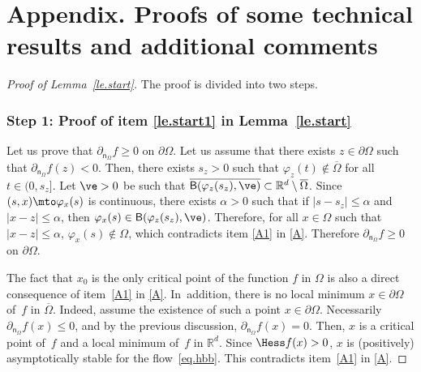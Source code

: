 \appendix
{}
\section*{Appendix. Proofs of some technical results and additional comments}

\label{sec:le.start}

\begin{proof}[Proof of Lemma~\ref{le.start}] The proof is divided into two steps.

\subsubsection*{Step 1: Proof of item \eqref{le.start1} in Lemma~\ref{le.start}}
Let us prove that $\partial_{\mathsf n_\Omega}f\ge 0$ on $\partial \Omega$. Let us assume that there exists $z\in \partial \Omega$ such that $\partial_{\mathsf n_\Omega}f(z)<0$. Then, there exists $s_z>0$ such that $\varphi_z(t) \notin \overline \Omega$ for all $t\in (0,s_z]$. Let $\ve >0$ be such that $\overline{\mathsf B(\varphi_z(s_z),\ve)} \subset \mathbb R^d\setminus \overline \Omega$. Since $(s,x)\mto \varphi_x(s)$ is continuous, there exists $\alpha>0$ such that if $|s-s_z|\le \alpha$ and $|x-z|\le \alpha$, then $ \varphi_x(s)\in \mathsf B(\varphi_z(s_z),\ve)$. Therefore, for all $x\in \Omega$ such that $|x-z|\le \alpha$, $ \varphi_x(s)\notin \Omega$, which contradicts item \eqref{A1} in \ref{A}. Therefore $\partial_{\mathsf n_\Omega}f\ge 0$ on $\partial \Omega$.

The fact that $x_0$ is the only critical point of the function $f$ in $\Omega$ is also a direct consequence of item~\eqref{A1} in \ref{A}. In~addition, there is no local minimum $x\in \partial \Omega$ of~$f$ in $\overline \Omega$. Indeed, assume the existence of such a point $x\in \partial \Omega$. Necessarily $\partial_{\mathsf n_\Omega}f(x)\le 0$, and by the previous discussion, $\partial_{\mathsf n_\Omega}f(x)= 0$. Then, $x$ is a critical point of~$f$ and a local minimum of~$f$ in $\mathbb R^d$. Since $\Hess f(x)>0$, $x$ is (positively) asymptotically stable for the flow~\eqref{eq.hbb}. This contradicts item~\eqref{A1} in \ref{A}.


\end{proof}
